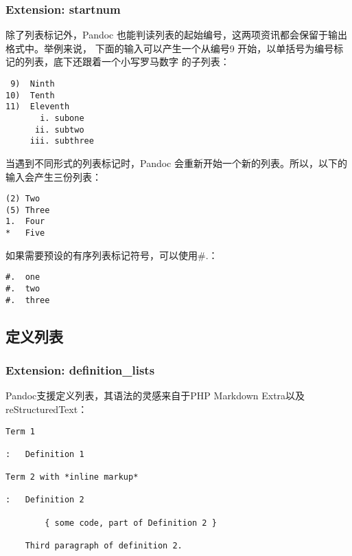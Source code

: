 \documentclass[fancyhdr,bookmark]{ctexbook}
\begin{document}
\hypertarget{extension-startnum}{%
\subsubsection{Extension: startnum}\label{extension-startnum}}

除了列表标记外，Pandoc
也能判读列表的起始编号，这两项资讯都会保留于输出格式中。举例来说，
下面的输入可以产生一个从编号9
开始，以单括号为编号标记的列表，底下还跟着一个小写罗马数字 的子列表：

\begin{lstlisting}
 9)  Ninth
10)  Tenth
11)  Eleventh
       i. subone
      ii. subtwo
     iii. subthree
\end{lstlisting}

当遇到不同形式的列表标记时，Pandoc
会重新开始一个新的列表。所以，以下的输入会产生三份列表：

\begin{lstlisting}
(2) Two
(5) Three
1.  Four
*   Five
\end{lstlisting}

如果需要预设的有序列表标记符号，可以使用\#.：

\begin{lstlisting}
#.  one
#.  two
#.  three
\end{lstlisting}

\hypertarget{ux5b9aux4e49ux5217ux8868}{%
\subsection{定义列表}\label{ux5b9aux4e49ux5217ux8868}}

\hypertarget{extension-definition_lists}{%
\subsubsection{Extension:
definition\_lists}\label{extension-definition_lists}}

Pandoc支援定义列表，其语法的灵感来自于PHP Markdown
Extra以及reStructuredText：

\begin{lstlisting}
Term 1

:   Definition 1

Term 2 with *inline markup*

:   Definition 2

        { some code, part of Definition 2 }

    Third paragraph of definition 2.
\end{lstlisting}
\end{document}
